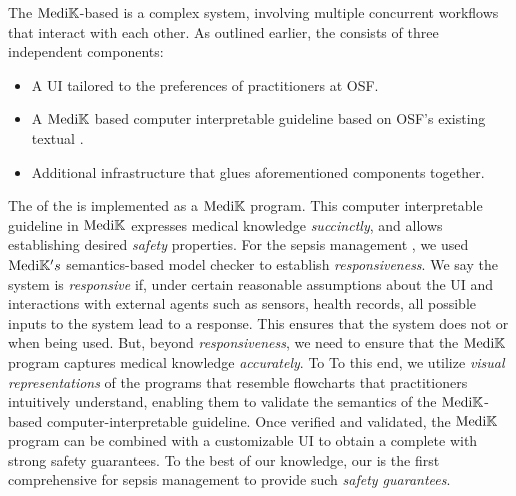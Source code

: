 The $\text{Medi}\mathbb{K}{}$-based \CDSS{} is a complex system, involving multiple
concurrent workflows that interact with each other. As outlined earlier,
the \CDSS{} consists of three independent components:
\begin{itemize}
  \itemsep0.0em
  \item A UI tailored to the preferences of practitioners at OSF.
  \item A $\text{Medi}\mathbb{K}{}{}$ based computer interpretable guideline based on OSF's
    existing textual \BPG{}.
  \item Additional infrastructure that glues aforementioned components together.
\end{itemize}


The \BPGLogic{} of the \CDSS{} is implemented as a $\text{Medi}\mathbb{K}{}{}$ program.
This computer interpretable guideline in $\text{Medi}\mathbb{K}{}$ expresses
medical knowledge \emph{succinctly}, and allows establishing desired \emph{safety} properties.
For the sepsis management \CDSS{}, we used $\text{Medi}\mathbb{K}{}{}'s$ semantics-based model checker to
establish \emph{responsiveness}. We say the system is \emph{responsive} if,
under certain reasonable assumptions about the UI and interactions with external
agents such as sensors, health records, all possible inputs to the
system lead to a response. This ensures that the system does not
 or  when being used. But, beyond \emph{responsiveness},
we need to ensure that the $\text{Medi}\mathbb{K}{}{}$ program captures medical knowledge \emph{accurately}. To
To this end, we utilize \emph{visual representations} of the programs that
resemble flowcharts that practitioners intuitively understand,
enabling them to validate the semantics of the $\text{Medi}\mathbb{K}{}{}$-based
computer-interpretable guideline. Once verified and validated, the $\text{Medi}\mathbb{K}{}{}$ program
can be combined with a customizable UI to obtain a complete \CDSS{} with
strong safety guarantees. To the best of our knowledge, our is the first
comprehensive \CDSSs{} for sepsis management to provide such \emph{safety
guarantees}.

